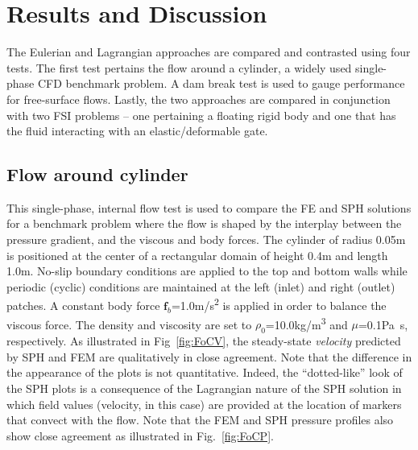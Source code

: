 \documentclass[final,3p,times]{elsarticle}
\begin{document}
\section{Results and Discussion}\label{sec:results}
The Eulerian and Lagrangian approaches are compared and contrasted using four tests. The first test pertains the flow around a cylinder, a widely used single-phase CFD benchmark problem. A dam break test is used to gauge performance for free-surface flows. Lastly, the two approaches are compared in conjunction with two FSI problems -- one pertaining a floating rigid body and one that has the fluid interacting with an elastic/deformable gate. 

\subsection{Flow around cylinder}
\label{subsec:flowAroundCylinder}
This single-phase, internal flow test is used to compare the FE and SPH solutions for a benchmark problem where the flow is shaped by the interplay between the pressure gradient, and the viscous and body forces. The cylinder of radius 0.05\si{m} is positioned at the center of a rectangular domain of height 0.4\si{m} and length 1.0\si{m}. No-slip boundary conditions are applied to the top and bottom walls while periodic (cyclic) conditions are maintained at the left (inlet) and right (outlet) patches. A constant body force $\mathbf{f}_b$=1.0\si{m/s^2} is applied in order to balance the viscous force. The density and viscosity are set to $\rho_0$=10.0\si{kg/m^3} and $\mu$=0.1\si{Pa.s}, respectively. As illustrated in Fig~\ref{fig:FoCV}, the steady-state {\textit{velocity}} predicted by SPH and FEM are qualitatively in close agreement. Note that the difference in the appearance of the plots is not quantitative. Indeed, the ``dotted-like'' look of the SPH plots is a consequence of the Lagrangian nature of the SPH solution in which field values (velocity, in this case) are provided at the location of markers that convect with the flow. Note that the FEM and SPH pressure profiles also show close agreement as illustrated in Fig.~\ref{fig:FoCP}.
\end{document}
